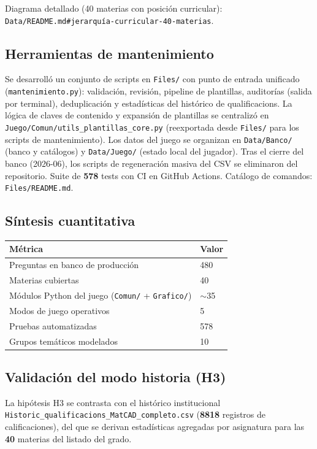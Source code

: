 \documentclass[11pt,a4paper]{article}
\begin{document}
Diagrama detallado (40 materias con posición curricular): \texttt{Data/README.md\#jerarquía-curricular-40-materias}.

\subsection{Herramientas de mantenimiento}

Se desarrolló un conjunto de scripts en \texttt{Files/} con punto de entrada unificado (\texttt{mantenimiento.py}): validación, revisión, pipeline de plantillas, auditorías (salida por terminal), deduplicación y estadísticas del histórico de qualificacions. La lógica de claves de contenido y expansión de plantillas se centralizó en \texttt{Juego/Comun/utils\_plantillas\_core.py} (reexportada desde \texttt{Files/} para los scripts de mantenimiento). Los datos del juego se organizan en \texttt{Data/Banco/} (banco y catálogos) y \texttt{Data/Juego/} (estado local del jugador). Tras el cierre del banco (2026-06), los scripts de regeneración masiva del CSV se eliminaron del repositorio. Suite de \textbf{578} tests con CI en GitHub Actions. Catálogo de comandos: \texttt{Files/README.md}.

\subsection{Síntesis cuantitativa}

\begin{tabular}{@{}ll@{}}
\toprule
\textbf{Métrica} & \textbf{Valor} \\
\midrule
Preguntas en banco de producción & 480 \\
Materias cubiertas & 40 \\
Módulos Python del juego (\texttt{Comun/} + \texttt{Grafico/}) & $\sim$35 \\
Modos de juego operativos & 5 \\
Pruebas automatizadas & 578 \\
Grupos temáticos modelados & 10 \\
\bottomrule
\end{tabular}

\subsection{Validación del modo historia (H3)}

La hipótesis H3 se contrasta con el histórico institucional \texttt{Historic\_qualificacions\_MatCAD\_completo.csv} (\textbf{8818} registros de calificaciones), del que se derivan estadísticas agregadas por asignatura para las \textbf{40} materias del listado del grado.
\end{document}
